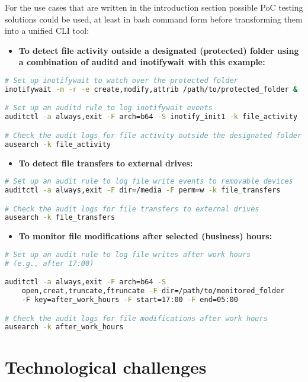 \documentclass{VUMIFPSmagistrinis}
\begin{document}
For the use cases that are written in the introduction section possible PoC testing solutions could be used, at least in bash command form before transforming them into a unified CLI tool:
\begin{itemize}
    \item \textbf{To detect file activity outside a designated (protected) folder using a combination of auditd and inotifywait with this example:}
\end{itemize}
\begin{lstlisting}[language=bash]
# Set up inotifywait to watch over the protected folder
inotifywait -m -r -e create,modify,attrib /path/to/protected_folder &

# Set up an auditd rule to log inotifywait events
auditctl -a always,exit -F arch=b64 -S inotify_init1 -k file_activity

# Check the audit logs for file activity outside the designated folder
ausearch -k file_activity
\end{lstlisting}

\begin{itemize}
    \item \textbf{To detect file transfers to external drives:}
\end{itemize}
\begin{lstlisting}[language=bash]
# Set up an audit rule to log file write events to removable devices
auditctl -a always,exit -F dir=/media -F perm=w -k file_transfers

# Check the audit logs for file transfers to external drives
ausearch -k file_transfers
\end{lstlisting}

\begin{itemize}
    \item \textbf{To monitor file modifications after selected (business) hours:}
\end{itemize}
\begin{lstlisting}[language=bash]
# Set up an audit rule to log file writes after work hours 
# (e.g., after 17:00)

auditctl -a always,exit -F arch=b64 -S 
    open,creat,truncate,ftruncate -F dir=/path/to/monitored_folder 
    -F key=after_work_hours -F start=17:00 -F end=05:00

# Check the audit logs for file modifications after work hours
ausearch -k after_work_hours
\end{lstlisting}

\section{Technological challenges}
\end{document}

